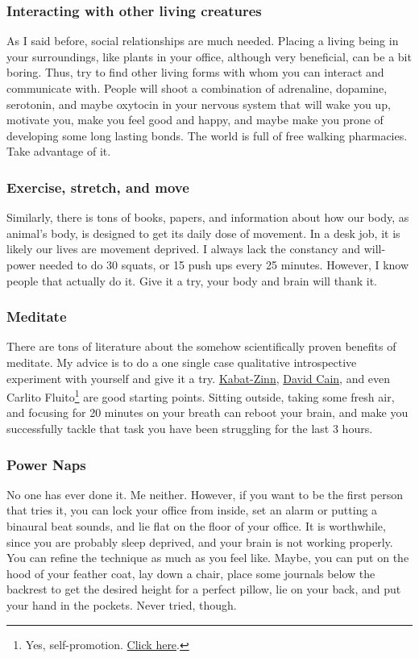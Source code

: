 \documentclass{article}
\begin{document}
\subsubsection{Interacting with other living creatures}
\label{subsubsec: interact}
As I said before, social relationships are much needed. Placing a living being in your surroundings, like plants in your office, although very beneficial, can be a bit boring. Thus, try to find other living forms with whom you can interact and communicate with. People will shoot a combination of adrenaline, dopamine, serotonin, and maybe oxytocin in your nervous system that will wake you up, motivate you, make you feel good and happy, and maybe make you prone of developing some long lasting bonds. The world is full of free walking pharmacies. Take advantage of it.

\subsubsection{Exercise, stretch, and move}
\label{subsubsec: Exercise}
Similarly, there is tons of books, papers, and information about how our body, as animal’s body, is designed to get its daily dose of movement. In a desk job, it is likely our lives are movement deprived. I always lack the constancy and will-power needed to do 30 squats, or 15 push ups every 25 minutes. However, I know people that actually do it. Give it a try, your body and brain will thank it. 
\subsubsection{Meditate}
\label{subsubsec: Meditate}
There are tons of literature about the somehow scientifically proven benefits of meditate. My advice is to do a one single case qualitative introspective experiment with yourself and give it a try. \href{https://en.wikipedia.org/wiki/Jon_Kabat-Zinn}{Kabat-Zinn}, \href{https://www.raptitude.com/}{David Cain}, and even Carlito Fluito\footnote{Yes, self-promotion. \href{https://www.carlitofluitoideas.com/meditation-app/}{Click here}.} are good starting points. Sitting outside, taking some fresh air, and focusing for 20 minutes on your breath can reboot your brain, and make you successfully tackle that task you have been struggling for the last 3 hours. 
\subsubsection{Power Naps}
\label{subsubsec: Power Naps}
No one has ever done it. Me neither. However, if you want to be the first person that tries it, you can lock your office from inside, set an alarm or putting a binaural beat sounds, and lie flat on the floor of your office. It is worthwhile, since you are probably sleep deprived, and your brain is not working properly. You can refine the technique as much as you feel like. Maybe, you can put on the hood of your feather coat, lay down a chair, place some journals below the backrest to get the desired height for a perfect pillow, lie on your back, and put your hand in the pockets. Never tried, though.
\end{document}
